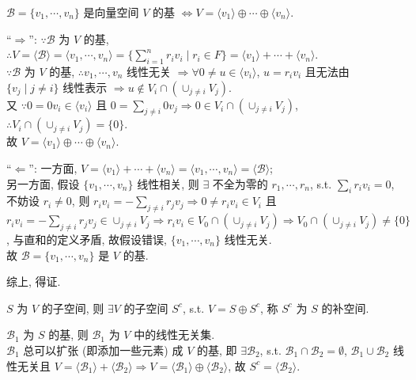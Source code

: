 \documentclass{note}
\begin{document}
\begin{thm}[(课本定理 1.8)]
    $\mathcal{B}=\{v_1,\cdots,v_n\}$ 是向量空间 $V$ 的基 $\Longleftrightarrow V=\langle v_1\rangle\oplus\cdots\oplus\langle v_n\rangle$.
\end{thm}
\begin{pf}
    ``$\Longrightarrow$'': $\because\mathcal{B}$ 为 $V$ 的基, $\therefore V=\langle\mathcal{B}\rangle=\langle v_1,\cdots,v_n\rangle=\{\sum_{i=1}^nr_iv_i\mid r_i\in F\}=\langle v_1\rangle+\cdots+\langle v_n\rangle$.\\
    $\because\mathcal{B}$ 为 $V$ 的基, $\therefore v_1,\cdots,v_n$ 线性无关 $\Longrightarrow\forall 0\neq u\in\langle v_i\rangle$, $u=r_iv_i$ 且无法由 $\{v_j\mid j\neq i\}$ 线性表示 $\Longrightarrow u\notin V_i\cap(\cup_{j\neq i}V_j)$.\\
    又 $\because 0=0v_i\in\langle v_i\rangle$ 且 $0=\sum_{j\neq i}0v_j\Longrightarrow 0\in V_i\cap(\cup_{j\neq i}V_j)$, $\therefore V_i\cap(\cup_{j\neq i}V_j)=\{0\}$.\\
    故 $V=\langle v_1\rangle\oplus\cdots\oplus\langle v_n\rangle$.

    ``$\Longleftarrow$'': 一方面, $V=\langle v_1\rangle+\cdots+\langle v_n\rangle=\langle v_1,\cdots,v_n\rangle=\langle\mathcal{B}\rangle$;\\
    另一方面, 假设 $\{v_1,\cdots,v_n\}$ 线性相关, 则 $\exists$ 不全为零的 $r_1,\cdots,r_n$, s.t. $\sum_{i}r_iv_i=0$,\\
    不妨设 $r_i\neq 0$, 则 $r_iv_i=-\sum_{j\neq i}r_jv_j\Longrightarrow 0\neq r_iv_i\in V_i$ 且 $r_iv_i=-\sum_{j\neq i}r_jv_j\in\cup_{j\neq i}V_j\Longrightarrow r_iv_i\in V_0\cap(\cup_{j\neq i}V_j)\Longrightarrow V_0\cap(\cup_{j\neq i}V_j)\neq\{0\}$, 与直和的定义矛盾, 故假设错误, $\{v_1,\cdots,v_n\}$ 线性无关.\\
    故 $\mathcal{B}=\{v_1,\cdots,v_n\}$ 是 $V$ 的基.

    综上, 得证.
\end{pf}

\begin{thm}[(课本定理 1.4)]
    $S$ 为 $V$ 的子空间, 则 $\exists V$ 的子空间 $S^c$, s.t. $V=S\oplus S^c$, 称 $S^c$ 为 $S$ 的补空间.
\end{thm}
\begin{pf}
    $\mathcal{B}_1$ 为 $S$ 的基, 则 $\mathcal{B}_1$ 为 $V$ 中的线性无关集.\\
    $\mathcal{B}_1$ 总可以扩张 (即添加一些元素) 成 $V$ 的基, 即 $\exists\mathcal{B}_2$, s.t. $\mathcal{B}_1\cap\mathcal{B}_2=\emptyset$, $\mathcal{B}_1\cup\mathcal{B}_2$ 线性无关且 $V=\langle\mathcal{B}_1\rangle+\langle\mathcal{B}_2\rangle\Longrightarrow V=\langle\mathcal{B}_1\rangle\oplus\langle\mathcal{B}_2\rangle$, 故 $S^c=\langle\mathcal{B}_2\rangle$.
\end{pf}
\end{document}
